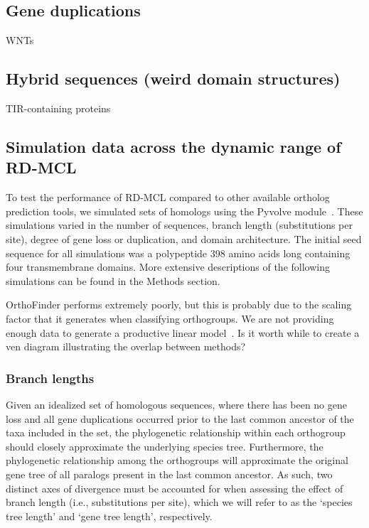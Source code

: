 \documentclass[twocolumn]{bmcart}  %
\begin{document}
\subsection{Gene duplications}\label{subsec:gene-duplications}
WNTs


\subsection{Hybrid sequences (weird domain structures)}\label{subsec:hybrid-sequencesweird-domain-structures}
TIR-containing proteins


\subsection{Simulation data across the dynamic range of RD-MCL}\label{subsec:simulationDataAcrossTheDynamicRangeOfRd-mcl}
To test the performance of RD-MCL compared to other available ortholog prediction tools, we simulated sets of homologs using the Pyvolve module~\cite{Spielman:2015kv}.
These simulations varied in the number of sequences, branch length (substitutions per site), degree of gene loss or duplication, and domain architecture.
The initial seed sequence for all simulations was a polypeptide 398 amino acids long containing four transmembrane domains.
More extensive descriptions of the following simulations can be found in the Methods section.

OrthoFinder performs extremely poorly, but this is probably due to the scaling factor that it generates when classifying orthogroups.
We are not providing enough data to generate a productive linear model~\cite{Emms:2015ig}.
Is it worth while to create a ven diagram illustrating the overlap between methods?


\subsubsection{Branch lengths}
Given an idealized set of homologous sequences, where there has been no gene loss and all gene duplications occurred prior to the last common ancestor of the taxa included in the set, the phylogenetic relationship within each orthogroup should closely approximate the underlying species tree.
Furthermore, the phylogenetic relationship among the orthogroups will approximate the original gene tree of all paralogs present in the last common ancestor.
As such, two distinct axes of divergence must be accounted for when assessing the effect of branch length (i.e., substitutions per site), which we will refer to as the `species tree length' and `gene tree length', respectively.
\end{document}
